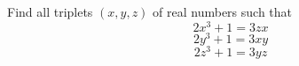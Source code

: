 Find all triplets $ (x,y,z) $ of real numbers such that\[ 2x^3 + 1 = 3zx \]\[ 2y^3 + 1 = 3xy \]\[ 2z^3 + 1 =  3yz \]